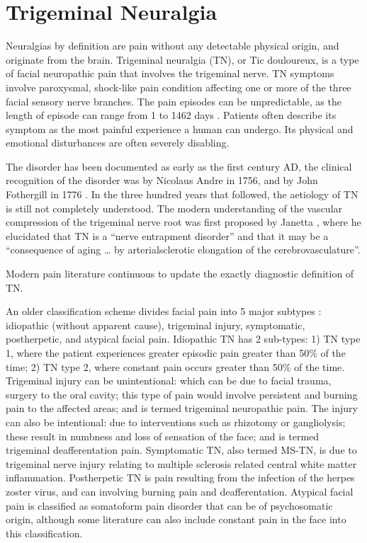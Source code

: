 \section{Trigeminal Neuralgia}

Neuralgias by definition are pain without any detectable physical origin, and originate from the brain. Trigeminal neuralgia (TN), or Tic douloureux, is a type of facial neuropathic pain that involves the trigeminal nerve. TN symptoms involve paroxysmal, shock-like pain condition affecting one or more of the three facial sensory nerve branches. The pain episodes can be unpredictable, as the length of episode can range from 1 to 1462 days \cite{Katusic1990}. Patients often describe its symptom as the most painful experience a human can undergo. Its physical and emotional disturbances are often severely disabling. 

The disorder has been documented as early as the first century AD, the clinical recognition of the disorder was by Nicolaus Andre in 1756, and by John Fothergill in 1776 \cite{Katusic1990}. In the three hundred years that followed, the aetiology of TN is still not completely understood. The modern understanding of the vascular compression of the trigeminal nerve root was first proposed by Janetta \cite{Jannetta1967}, where he elucidated that TN is a “nerve entrapment disorder” and that it may be a “consequence of aging … by arterialsclerotic elongation of the cerebrovasculature”.

Modern pain literature continuous to update the exactly diagnostic definition of TN. 

An older classification scheme divides facial pain into 5 major subtypes \cite{Burchiel2003,Eller2005}: idiopathic (without apparent cause), trigeminal injury, symptomatic, postherpetic, and atypical facial pain. Idiopathic TN has 2 sub-types: 1) TN type 1, where the patient experiences greater episodic pain greater than 50\% of the time; 2) TN type 2, where constant pain occurs greater than 50\% of the time. Trigeminal injury can be unintentional: which can be due to facial trauma, surgery to the oral cavity; this type of pain would involve persistent and burning pain to the affected areas; and is termed trigeminal neuropathic pain. The injury can also be intentional: due to interventions such as rhizotomy or gangliolysis; these result in numbness and loss of sensation of the face; and is termed trigeminal deafferentation pain. Symptomatic TN, also termed MS-TN, is due to trigeminal nerve injury relating to multiple sclerosis related central white matter inflammation. Postherpetic TN is pain resulting from the infection of the herpes zoster virus, and can involving burning pain and deafferentation. Atypical facial pain is classified as somatoform pain disorder that can be of psychosomatic origin, although some literature can also include constant pain in the face into this classification. 

